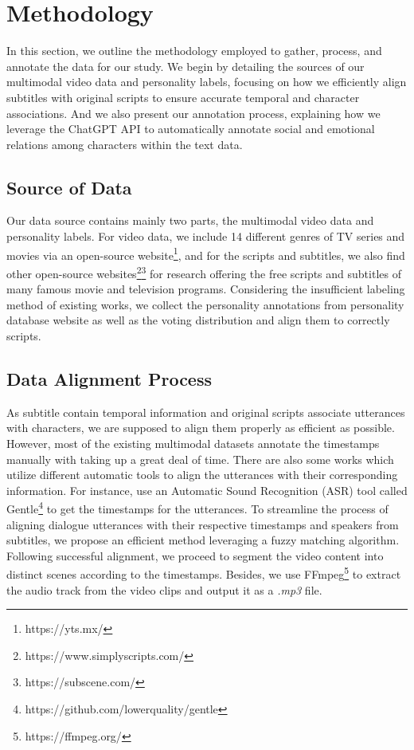 \section{Methodology}
In this section, we outline the methodology employed to gather, process, and annotate the data for our study. We begin by detailing the sources of our multimodal video data and personality labels, focusing on how we efficiently align subtitles with original scripts to ensure accurate temporal and character associations. And we also present our annotation process, explaining how we leverage the ChatGPT API to automatically annotate social and emotional relations among characters within the text data. 
\subsection{Source of Data}
Our data source contains mainly two parts, the multimodal video data and personality labels. For video data, we include 14 different genres of TV series and movies via an open-source website\footnote[1]{https://yts.mx/}, and for the scripts and subtitles, we also find other open-source websites\footnote[2]{https://www.simplyscripts.com/}\footnote[3]{https://subscene.com/} for research offering the free scripts and subtitles of many famous movie and television programs. Considering the insufficient labeling method of existing works, we collect the personality annotations from personality database website as well as the voting distribution and align them to correctly scripts. 
\subsection{Data Alignment Process}
As subtitle contain temporal information and original scripts associate utterances with characters, we are supposed to align them properly as efficient as possible. However, most of the existing multimodal datasets annotate the timestamps manually with taking up a great deal of time. There are also some works which utilize different automatic tools to align the utterances with their corresponding information. For instance, \cite{lian2024merbench} use an Automatic Sound Recognition (ASR) tool called Gentle\footnote[4]{https://github.com/lowerquality/gentle} to get the timestamps for the utterances. To streamline the process of aligning dialogue utterances with their respective timestamps and speakers from subtitles, we propose an efficient method leveraging a fuzzy matching algorithm. 
Following successful alignment, we proceed to segment the video content into distinct scenes according to the timestamps. Besides, we use FFmpeg\footnote[5]{https://ffmpeg.org/} to extract the audio track from the video clips and output it as a \textit{.mp3} file.


